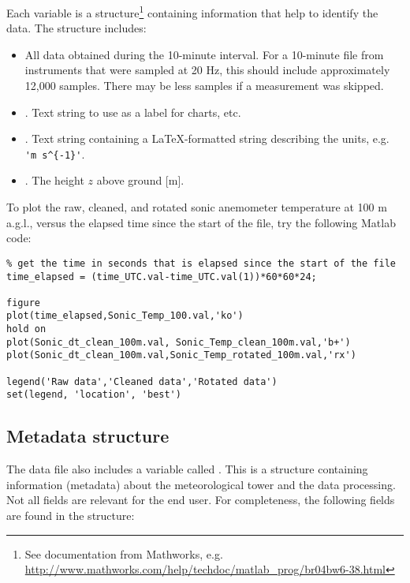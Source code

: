 Each variable is a structure\footnote{See documentation from Mathworks, e.g. \url{http://www.mathworks.com/help/techdoc/matlab_prog/br04bw6-38.html}} containing information that help to identify the data. The structure includes:
\begin{itemize}
\item {} All data obtained during the 10-minute interval. For a 10-minute file from instruments that were sampled at 20 Hz, this should include approximately 12,000 samples. There may be less samples if a measurement was skipped.
\item {}. Text string to use as a label for charts, etc.
\item {}. Text string containing a \LaTeX-formatted string describing the units, e.g. \verb+'m s^{-1}'+.
\item {}. The height $z$ above ground [m].
\end{itemize}

To plot the raw, cleaned, and rotated sonic anemometer temperature at 100 m a.g.l., versus the elapsed time since the start of the file, try the following Matlab code:

\begin{lstlisting}
% get the time in seconds that is elapsed since the start of the file
time_elapsed = (time_UTC.val-time_UTC.val(1))*60*60*24;

figure
plot(time_elapsed,Sonic_Temp_100.val,'ko')
hold on
plot(Sonic_dt_clean_100m.val, Sonic_Temp_clean_100m.val,'b+')
plot(Sonic_dt_clean_100m.val,Sonic_Temp_rotated_100m.val,'rx')

legend('Raw data','Cleaned data','Rotated data')
set(legend, 'location', 'best')
\end{lstlisting}

\subsection{Metadata structure\label{s:20HzMetadata}}
The data file also includes a variable called . This is a structure containing information (metadata) about the meteorological tower and the data processing. Not all fields are relevant for the end user. For completeness, the following fields are found in the  structure:

